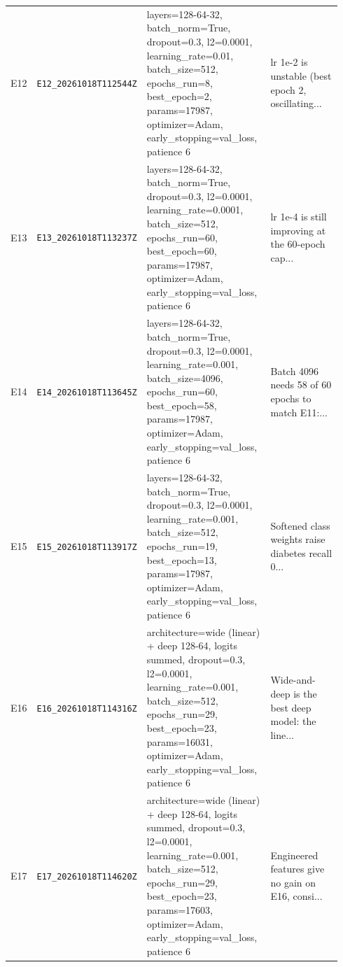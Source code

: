 \begin{footnotesize}
\begin{longtable}{@{}p{0.04\linewidth}p{0.17\linewidth}p{0.41\linewidth}p{0.32\linewidth}@{}}
E12 & \texttt{E12\_20261018T112544Z} & layers=128-64-32, batch\_norm=True, dropout=0.3, l2=0.0001, learning\_rate=0.01, batch\_size=512, epochs\_run=8, best\_epoch=2, params=17987, optimizer=Adam, early\_stopping=val\_loss, patience 6 & lr 1e-2 is unstable (best epoch 2, oscillating... \\
E13 & \texttt{E13\_20261018T113237Z} & layers=128-64-32, batch\_norm=True, dropout=0.3, l2=0.0001, learning\_rate=0.0001, batch\_size=512, epochs\_run=60, best\_epoch=60, params=17987, optimizer=Adam, early\_stopping=val\_loss, patience 6 & lr 1e-4 is still improving at the 60-epoch cap... \\
E14 & \texttt{E14\_20261018T113645Z} & layers=128-64-32, batch\_norm=True, dropout=0.3, l2=0.0001, learning\_rate=0.001, batch\_size=4096, epochs\_run=60, best\_epoch=58, params=17987, optimizer=Adam, early\_stopping=val\_loss, patience 6 & Batch 4096 needs 58 of 60 epochs to match E11:... \\
E15 & \texttt{E15\_20261018T113917Z} & layers=128-64-32, batch\_norm=True, dropout=0.3, l2=0.0001, learning\_rate=0.001, batch\_size=512, epochs\_run=19, best\_epoch=13, params=17987, optimizer=Adam, early\_stopping=val\_loss, patience 6 & Softened class weights raise diabetes recall 0... \\
E16 & \texttt{E16\_20261018T114316Z} & architecture=wide (linear) + deep 128-64, logits summed, dropout=0.3, l2=0.0001, learning\_rate=0.001, batch\_size=512, epochs\_run=29, best\_epoch=23, params=16031, optimizer=Adam, early\_stopping=val\_loss, patience 6 & Wide-and-deep is the best deep model: the line... \\
E17 & \texttt{E17\_20261018T114620Z} & architecture=wide (linear) + deep 128-64, logits summed, dropout=0.3, l2=0.0001, learning\_rate=0.001, batch\_size=512, epochs\_run=29, best\_epoch=23, params=17603, optimizer=Adam, early\_stopping=val\_loss, patience 6 & Engineered features give no gain on E16, consi... \\
\bottomrule
\end{longtable}
\end{footnotesize}
